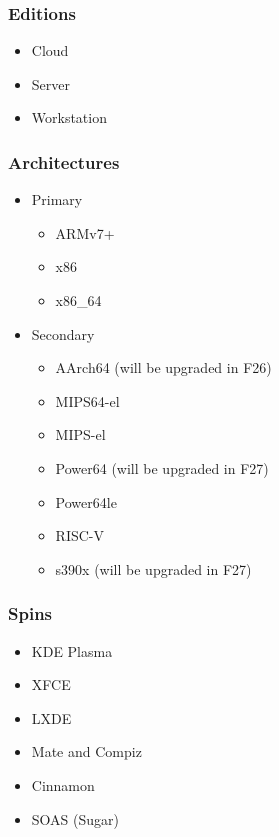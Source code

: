 \documentclass[t,aspectratio=169]{beamer}
\begin{document}
\begin{frame}
    \frametitle{Editions}
    \begin{itemize}
        \item<2-> Cloud
        \item<3-> Server
        \item<4-> Workstation
    \end{itemize}
\end{frame}

\begin{frame}
    \frametitle{Architectures}
    \begin{itemize}
        \item<2-> Primary
        \begin{itemize}
            \item<3-> ARMv7+
            \item<4-> x86
            \item<5-> x86\_64
        \end{itemize}
        \item<6-> Secondary
        \begin{itemize}
            \item<6-> AArch64 (will be upgraded in F26)
            \item<6-> MIPS64-el
            \item<6-> MIPS-el
            \item<6-> Power64 (will be upgraded in F27)
            \item<6-> Power64le
            \item<6-> RISC-V
            \item<6-> s390x (will be upgraded in F27)
        \end{itemize}
    \end{itemize}
\end{frame}

\begin{frame}
    \frametitle{Spins}
    \begin{itemize}
        \item KDE Plasma
        \item XFCE
        \item LXDE
        \item Mate and Compiz
        \item Cinnamon
        \item SOAS (Sugar)
    \end{itemize}
\end{frame}
\end{document}

